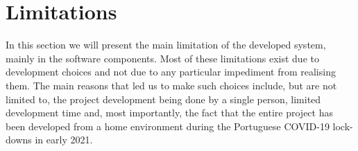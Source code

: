 \section{Limitations} \label{sec:limitations}
In this section we will present the main limitation of the developed system, mainly in the software components.
Most of these limitations exist due to development choices and not due to any particular impediment from realising them.
The main reasons that led us to make such choices include, but are not limited to, the project development being done by a single person, limited development time and, most importantly, the fact that the entire project has been developed from a home environment during the Portuguese COVID-19 lock-downs in early 2021.


